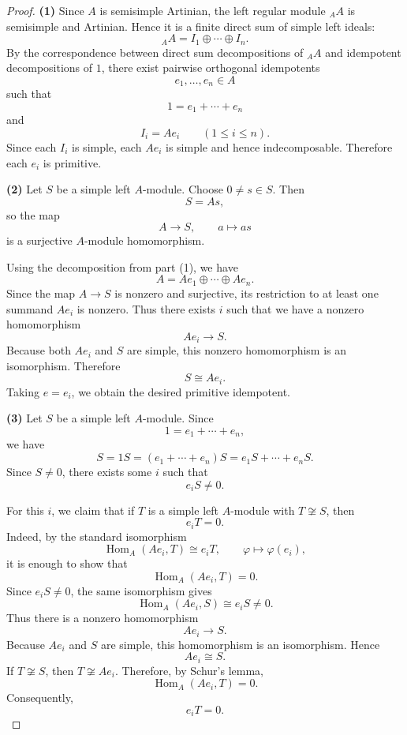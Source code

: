 \begin{proof}
    \textbf{(1)}
    Since $A$ is semisimple Artinian, the left regular module ${}_A A$ is semisimple and
    Artinian. Hence it is a finite direct sum of simple left ideals:
    \[
        {}_A A = I_1\oplus \cdots \oplus I_n .
    \]
    By the correspondence between direct sum decompositions of ${}_A A$ and idempotent
    decompositions of $1$, there exist pairwise orthogonal idempotents
    \[
        e_1,\dots,e_n\in A
    \]
    such that
    \[
        1=e_1+\cdots+e_n
    \]
    and
    \[
        I_i=Ae_i
        \qquad (1\le i\le n).
    \]
    Since each $I_i$ is simple, each $Ae_i$ is simple and hence indecomposable. Therefore
    each $e_i$ is primitive.

    \medskip

    \textbf{(2)}
    Let $S$ be a simple left $A$-module. Choose $0\neq s\in S$. Then
    \[
        S=As,
    \]
    so the map
    \[
        A\longrightarrow S,
        \qquad
        a\longmapsto as
    \]
    is a surjective $A$-module homomorphism.

    Using the decomposition from part \textup{(1)}, we have
    \[
        A=Ae_1\oplus\cdots\oplus Ae_n.
    \]
    Since the map $A\to S$ is nonzero and surjective, its restriction to at least one
    summand $Ae_i$ is nonzero. Thus there exists $i$ such that we have a nonzero
    homomorphism
    \[
        Ae_i\longrightarrow S.
    \]
    Because both $Ae_i$ and $S$ are simple, this nonzero homomorphism is an isomorphism.
    Therefore
    \[
        S\cong Ae_i.
    \]
    Taking $e=e_i$, we obtain the desired primitive idempotent.

    \medskip

    \textbf{(3)}
    Let $S$ be a simple left $A$-module. Since
    \[
        1=e_1+\cdots+e_n,
    \]
    we have
    \[
        S=1S=(e_1+\cdots+e_n)S=e_1S+\cdots+e_nS.
    \]
    Since $S\neq 0$, there exists some $i$ such that
    \[
        e_iS\neq 0.
    \]

    For this $i$, we claim that if $T$ is a simple left $A$-module with $T\not\cong S$,
    then
    \[
        e_iT=0.
    \]
    Indeed, by the standard isomorphism
    \[
        \operatorname{Hom}_A(Ae_i,T)\cong e_iT,
        \qquad
        \varphi\longmapsto \varphi(e_i),
    \]
    it is enough to show that
    \[
        \operatorname{Hom}_A(Ae_i,T)=0.
    \]
    Since $e_iS\neq 0$, the same isomorphism gives
    \[
        \operatorname{Hom}_A(Ae_i,S)\cong e_iS\neq 0.
    \]
    Thus there is a nonzero homomorphism
    \[
        Ae_i\longrightarrow S.
    \]
    Because $Ae_i$ and $S$ are simple, this homomorphism is an isomorphism. Hence
    \[
        Ae_i\cong S.
    \]
    If $T\not\cong S$, then $T\not\cong Ae_i$. Therefore, by Schur's lemma,
    \[
        \operatorname{Hom}_A(Ae_i,T)=0.
    \]
    Consequently,
    \[
        e_iT=0.
    \]
\end{proof}

